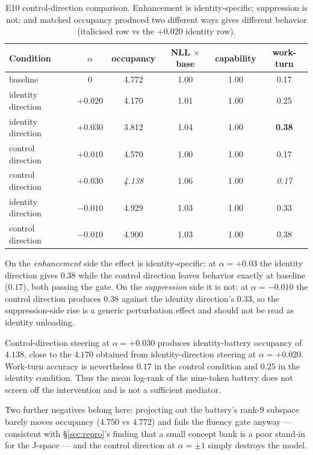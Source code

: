 \documentclass{article}
\begin{document}
\begin{table}[h]
\centering\small
\begin{tabular}{lccccc}
\toprule
\textbf{Condition} & $\alpha$ & occupancy & NLL $\times$base & capability & work-turn \\
\midrule
baseline & 0 & 4.772 & 1.00 & 1.00 & 0.17 \\
identity direction & $+0.020$ & 4.170 & 1.01 & 1.00 & 0.25 \\
identity direction & $+0.030$ & 3.812 & 1.04 & 1.00 & \textbf{0.38} \\
control direction & $+0.010$ & 4.570 & 1.00 & 1.00 & 0.17 \\
control direction & $+0.030$ & \emph{4.138} & 1.06 & 1.00 & \emph{0.17} \\
identity direction & $-0.010$ & 4.929 & 1.03 & 1.00 & 0.33 \\
control direction & $-0.010$ & 4.900 & 1.03 & 1.00 & 0.38 \\
\bottomrule
\end{tabular}
\caption{E10 control-direction comparison. Enhancement is identity-specific; suppression is not; and matched occupancy produced two different ways gives different behavior (italicised row vs the $+0.020$ identity row).}
\label{tab:e10ctrl}
\end{table}

On the \emph{enhancement} side the effect is identity-specific: at $\alpha=+0.03$ the identity direction gives $0.38$ while the control direction leaves behavior exactly at baseline ($0.17$), both passing the gate. On the \emph{suppression} side it is not: at $\alpha=-0.010$ the control direction produces $0.38$ against the identity direction's $0.33$, so the suppression-side rise is a generic perturbation effect and should not be read as identity unloading.

Control-direction steering at $\alpha=+0.030$ produces identity-battery occupancy of $4.138$, close to the $4.170$ obtained from identity-direction steering at $\alpha=+0.020$. Work-turn accuracy is nevertheless $0.17$ in the control condition and $0.25$ in the identity condition. Thus the mean log-rank of the nine-token battery does not screen off the intervention and is not a sufficient mediator.

Two further negatives belong here: projecting out the battery's rank-9 subspace barely moves occupancy ($4.750$ vs $4.772$) and fails the fluency gate anyway --- consistent with \S\ref{sec:repro}'s finding that a small concept bank is a poor stand-in for the J-space --- and the control direction at $\alpha=\pm1$ simply destroys the model.
\end{document}
